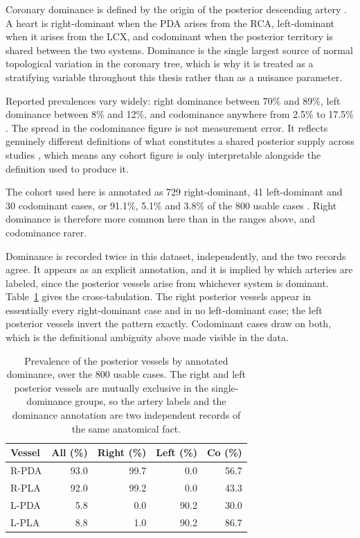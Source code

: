 Coronary dominance is defined by the origin of the posterior descending artery
\cite{allwork1987applied}.
A heart is right-dominant when the PDA arises from the RCA, left-dominant when it arises from
the LCX, and codominant when the posterior territory is shared between the two systems.
Dominance is the single largest source of normal topological variation in the coronary tree,
which is why it is treated as a stratifying variable throughout this thesis rather than as a
nuisance parameter.

Reported prevalences vary widely: right dominance between 70\% and 89\%, left dominance
between 8\% and 12\%, and codominance anywhere from 2.5\% to 17.5\%
\cite{jaha2024dominance}.
The spread in the codominance figure is not measurement error.
It reflects genuinely different definitions of what constitutes a shared posterior supply
across studies \cite{jaha2024dominance}, which means any cohort figure is only interpretable
alongside the definition used to produce it.

The cohort used here is annotated as 729 right-dominant, 41 left-dominant and 30 codominant
cases, or 91.1\%, 5.1\% and 3.8\% of the 800 usable cases \cite{bransby2026imagecasx}.
Right dominance is therefore more common here than in the ranges above, and codominance
rarer.

Dominance is recorded twice in this dataset, independently, and the two records agree.
It appears as an explicit annotation, and it is implied by which arteries are labeled, since
the posterior vessels arise from whichever system is dominant.
Table~\ref{tab:posterior} gives the cross-tabulation.
The right posterior vessels appear in essentially every right-dominant case and in no
left-dominant case; the left posterior vessels invert the pattern exactly.
Codominant cases draw on both, which is the definitional ambiguity above made visible in the
data.

\begin{table}[t]
  \centering
  \caption{Prevalence of the posterior vessels by annotated dominance, over the 800 usable
    cases. The right and left posterior vessels are mutually exclusive in the
    single-dominance groups, so the artery labels and the dominance annotation are two
    independent records of the same anatomical fact.}
  \label{tab:posterior}
  \begin{tabular}{lrrrr}
    \hline
    Vessel & All (\%) & Right (\%) & Left (\%) & Co (\%) \\
    \hline
    R-PDA & 93.0 & 99.7 &  0.0 & 56.7 \\
    R-PLA & 92.0 & 99.2 &  0.0 & 43.3 \\
    L-PDA &  5.8 &  0.0 & 90.2 & 30.0 \\
    L-PLA &  8.8 &  1.0 & 90.2 & 86.7 \\
    \hline
  \end{tabular}
\end{table}

